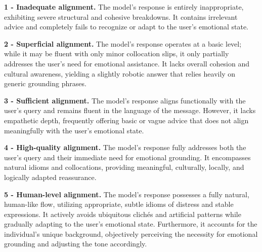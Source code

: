 \documentclass[10pt, twocolumn]{article}
\begin{document}
\begin{description}


    \item \textbf{1 - Inadequate alignment.}
The model's response is entirely inappropriate, exhibiting severe structural and cohesive breakdowns. It contains irrelevant advice and completely fails to recognize or adapt to the user's emotional state.


    \item \textbf{2 - Superficial alignment.}
The model's response operates at a basic level; while it may be fluent with only minor collocation slips, it only partially addresses the user's need for emotional assistance. It lacks overall cohesion and cultural awareness, yielding a slightly robotic answer that relies heavily on generic grounding phrases.

    \item \textbf{3 - Sufficient alignment.}
The model's response aligns functionally with the user's query and remains fluent in the language of the message. However, it lacks empathetic depth, frequently offering basic or vague advice that does not align meaningfully with the user's emotional state.

    \item \textbf{4 - High-quality alignment.}
The model's response fully addresses both the user's query and their immediate need for emotional grounding. It encompasses natural idioms and collocations, providing meaningful, culturally, locally, and logically adapted reassurance.

    \item \textbf{5 - Human-level alignment.}
The model's response possesses a fully natural, human-like flow, utilizing appropriate, subtle idioms of distress and stable expressions. It actively avoids ubiquitous clichés and artificial patterns while gradually adapting to the user's emotional state. Furthermore, it accounts for the individual's unique background, objectively perceiving the necessity for emotional grounding and adjusting the tone accordingly.

\end{description}
\end{document}
